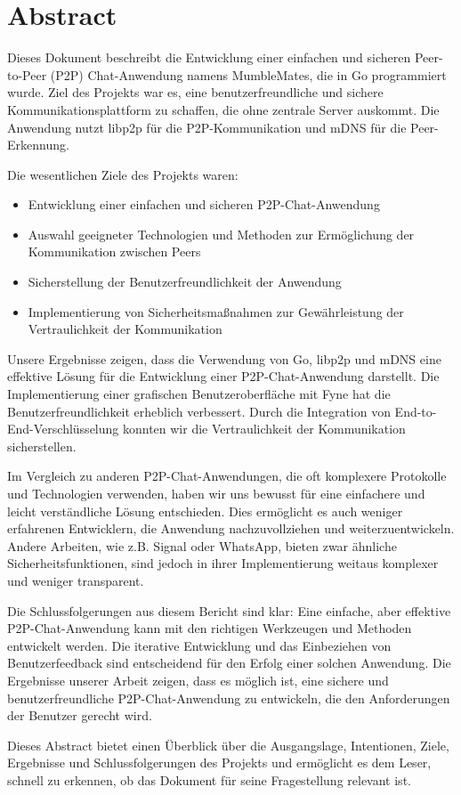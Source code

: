 \section*{Abstract}

Dieses Dokument beschreibt die Entwicklung einer einfachen und sicheren Peer-to-Peer (P2P) Chat-Anwendung namens MumbleMates, die in Go programmiert wurde. Ziel des Projekts war es, eine benutzerfreundliche und sichere Kommunikationsplattform zu schaffen, die ohne zentrale Server auskommt. Die Anwendung nutzt libp2p für die P2P-Kommunikation und mDNS für die Peer-Erkennung.

Die wesentlichen Ziele des Projekts waren:
\begin{itemize}
    \item Entwicklung einer einfachen und sicheren P2P-Chat-Anwendung
    \item Auswahl geeigneter Technologien und Methoden zur Ermöglichung der Kommunikation zwischen Peers
    \item Sicherstellung der Benutzerfreundlichkeit der Anwendung
    \item Implementierung von Sicherheitsmaßnahmen zur Gewährleistung der Vertraulichkeit der Kommunikation
\end{itemize}

Unsere Ergebnisse zeigen, dass die Verwendung von Go, libp2p und mDNS eine effektive Lösung für die Entwicklung einer P2P-Chat-Anwendung darstellt. Die Implementierung einer grafischen Benutzeroberfläche mit Fyne hat die Benutzerfreundlichkeit erheblich verbessert. Durch die Integration von End-to-End-Verschlüsselung konnten wir die Vertraulichkeit der Kommunikation sicherstellen.

Im Vergleich zu anderen P2P-Chat-Anwendungen, die oft komplexere Protokolle und Technologien verwenden, haben wir uns bewusst für eine einfachere und leicht verständliche Lösung entschieden. Dies ermöglicht es auch weniger erfahrenen Entwicklern, die Anwendung nachzuvollziehen und weiterzuentwickeln. Andere Arbeiten, wie z.B. Signal oder WhatsApp, bieten zwar ähnliche Sicherheitsfunktionen, sind jedoch in ihrer Implementierung weitaus komplexer und weniger transparent.

Die Schlussfolgerungen aus diesem Bericht sind klar: Eine einfache, aber effektive P2P-Chat-Anwendung kann mit den richtigen Werkzeugen und Methoden entwickelt werden. Die iterative Entwicklung und das Einbeziehen von Benutzerfeedback sind entscheidend für den Erfolg einer solchen Anwendung. Die Ergebnisse unserer Arbeit zeigen, dass es möglich ist, eine sichere und benutzerfreundliche P2P-Chat-Anwendung zu entwickeln, die den Anforderungen der Benutzer gerecht wird.

Dieses Abstract bietet einen Überblick über die Ausgangslage, Intentionen, Ziele, Ergebnisse und Schlussfolgerungen des Projekts und ermöglicht es dem Leser, schnell zu erkennen, ob das Dokument für seine Fragestellung relevant ist.